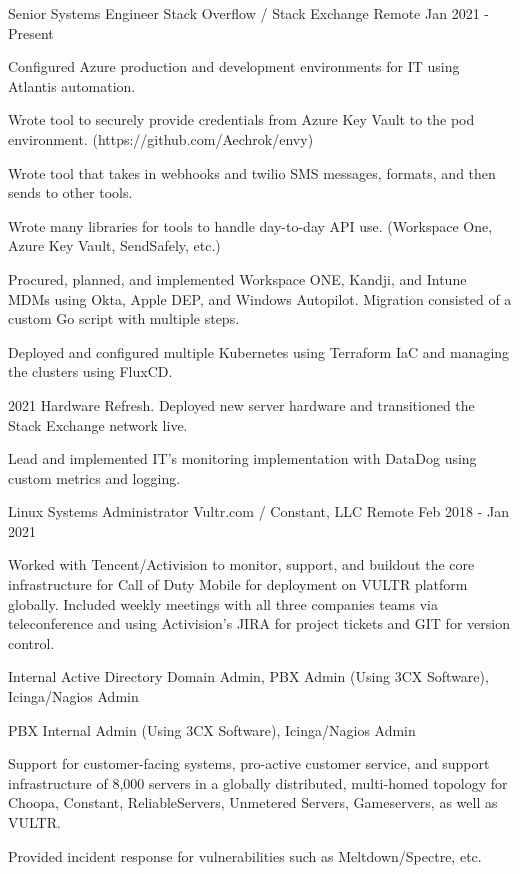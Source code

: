 
\begin{cventries}

	\cventry
	{Senior Systems Engineer}
	{Stack Overflow / Stack Exchange}
	{Remote}
	{Jan 2021 - Present}
	{
		\begin{cvitems}
		\item {Configured Azure production and development environments for IT using Atlantis automation.}
		\item {Wrote tool to securely provide credentials from Azure Key Vault to the pod environment. (https://github.com/Aechrok/envy)}
		\item {Wrote tool that takes in webhooks and twilio SMS messages, formats, and then sends to other tools.}
		\item {Wrote many libraries for tools to handle day-to-day API use. (Workspace One, Azure Key Vault, SendSafely, etc.)}
		\item {Procured, planned, and implemented Workspace ONE, Kandji, and Intune MDMs using Okta, Apple DEP, and Windows Autopilot. Migration consisted of a custom Go script with multiple steps.}
		\item {Deployed and configured multiple Kubernetes using Terraform IaC and managing the clusters using FluxCD.}
		\item {2021 Hardware Refresh. Deployed new server hardware and transitioned the Stack Exchange network live.}
		\item {Lead and implemented IT's monitoring implementation with DataDog using custom metrics and logging.}
		\end{cvitems}
	}


	\cventry
	{Linux Systems Administrator}
	{Vultr.com / Constant, LLC}
	{Remote}
	{Feb 2018 - Jan 2021}
	{
		\begin{cvitems}
		\item {Worked with Tencent/Activision to monitor, support, and buildout the core infrastructure for Call of Duty Mobile for deployment on VULTR platform globally. Included weekly meetings with all three companies teams via teleconference and using Activision's JIRA for project tickets and GIT for version control.}
		\item {Internal Active Directory Domain Admin, PBX Admin (Using 3CX Software), Icinga/Nagios Admin}
		\item {PBX Internal Admin (Using 3CX Software), Icinga/Nagios Admin}
		\item {Support for customer-facing systems, pro-active customer service, and support infrastructure of 8,000 servers in a globally distributed, multi-homed topology for Choopa, Constant, ReliableServers, Unmetered Servers, Gameservers, as well as VULTR.}
		\item {Provided incident response for vulnerabilities such as Meltdown/Spectre, etc.}
		\end{cvitems}
	}


\end{cventries}
